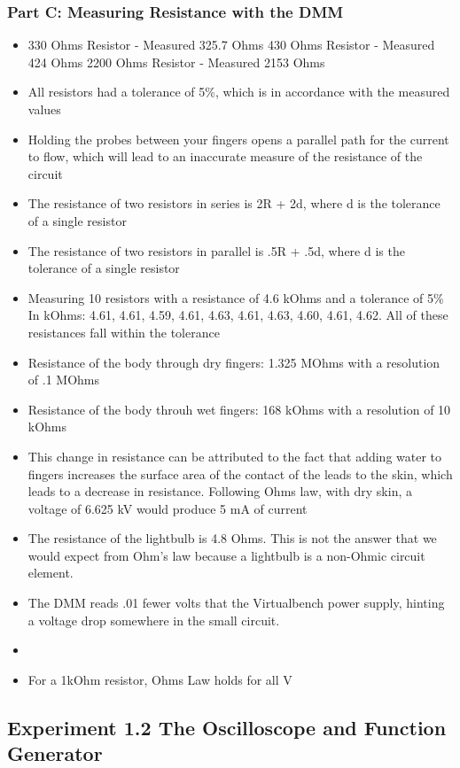 \documentclass[10pt]{article}
\begin{document}
	\subsubsection{Part C: Measuring Resistance with the DMM}
	\begin{itemize}
	\item 330 Ohms Resistor - Measured 325.7 Ohms
 430 Ohms Resistor - Measured 424 Ohms
 2200 Ohms Resistor - Measured 2153 Ohms
	\item All resistors had a tolerance of 5\%, which is in accordance with the measured values
	\item Holding the probes between your fingers opens a parallel path for the current to flow, which will lead to an inaccurate measure of the resistance of the circuit  
	\item The resistance of two resistors in series is 2R + 2d, where d is the tolerance of a single resistor
	\item The resistance of two resistors in parallel is .5R + .5d, where d is the tolerance of a single resistor
	\item Measuring 10 resistors with a resistance of 4.6 kOhms and a tolerance of 5\%
In kOhms: 4.61, 4.61, 4.59, 4.61, 4.63, 4.61, 4.63, 4.60, 4.61, 4.62. All of these resistances fall within the tolerance
	\item Resistance of the body through dry fingers: 1.325 MOhms with a resolution of .1 MOhms
	\item Resistance of the body throuh wet fingers: 168 kOhms with a resolution of 10 kOhms
	\item This change in resistance can be attributed to the fact that adding water to fingers increases the surface area of the contact of the leads to the skin, which leads to a decrease in resistance. Following Ohms law, with dry skin, a voltage of 6.625 kV would produce 5 mA of current
	\item The resistance of the lightbulb is 4.8 Ohms. This is not the answer that we would expect from Ohm's law because a lightbulb is a non-Ohmic circuit element.
	\item The DMM reads .01 fewer volts that the Virtualbench power supply, hinting a voltage drop somewhere in the small circuit.
	\item
	\item For a  1kOhm resistor, Ohms Law holds for all V
	\end{itemize}

	\subsection{Experiment 1.2 The Oscilloscope and Function Generator}
\end{document}
